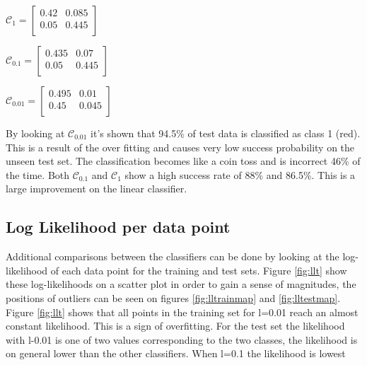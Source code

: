 \documentclass[twoside,twocolumn]{article}
\begin{document}
\begin{center}
$\mathcal{C}_1=  
\begin{bmatrix}
    0.42 & 0.085  \\
    0.05 & 0.445 \\
\end{bmatrix}$

$\mathcal{C}_{0.1}=  
\begin{bmatrix}
    0.435 & 0.07  \\
    0.05 & 0.445 \\
\end{bmatrix}$

$\mathcal{C}_{0.01}=  
\begin{bmatrix}
    0.495 & 0.01  \\
    0.45 & 0.045 \\
\end{bmatrix}$
\end{center}

By looking at $\mathcal{C}_{0.01}$ it's shown that 94.5\% of test data is classified as class 1 (red). This is a result of the over fitting and causes very low success probability on the unseen test set. The classification becomes like a coin toss and is incorrect 46\% of the time. Both $\mathcal{C}_{0.1}$ and $\mathcal{C}_1$ show a high success rate of 88\% and 86.5\%. This is a large improvement on the linear classifier.

\subsection{Log Likelihood per data point}
Additional comparisons between the classifiers can be done by looking at the log-likelihood of each data point for the training and test sets. Figure \ref{fig:llt} show these log-likelihoods on a scatter plot in order to gain a sense of magnitudes, the positions of outliers can be seen on figures \ref{fig:lltrainmap} and \ref{fig:lltestmap}.
\newline
Figure \ref{fig:llt} shows that all points in the training set for l=0.01 reach an almost constant likelihood. This is a sign of overfitting. For the test set the likelihood with l-0.01 is one of two values corresponding to the two classes, the likelihood is on general lower than the other classifiers. When l=0.1 the likelihood is lowest
\onecolumn
\end{document}
